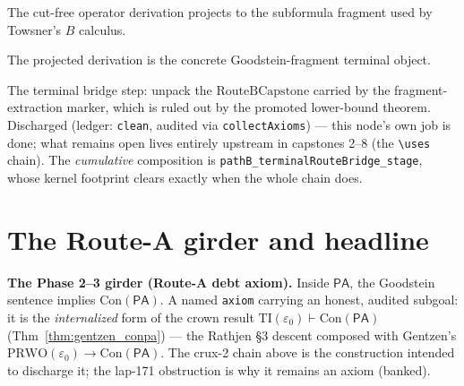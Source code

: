 \begin{theorem}\label{thm:pathBSubformulaProjection}
  \notready
The cut-free operator derivation projects to the subformula fragment used by Towsner's \(B\)
calculus.
\end{theorem}

\begin{theorem}\label{thm:pathBGoodsteinFragmentExtraction}
  \notready
The projected derivation is the concrete Goodstein-fragment terminal object.
\end{theorem}

\begin{theorem}\label{thm:pathBTerminalRouteBridge}
  \leanok
The terminal bridge step: unpack the \(\mathrm{RouteBCapstone}\) carried by the fragment-extraction
marker, which is ruled out by the promoted lower-bound theorem.  Discharged (ledger: \texttt{clean},
audited via \texttt{collectAxioms}) --- this node's own job is done; what remains open lives entirely
upstream in capstones 2--8 (the \texttt{\textbackslash uses} chain).  The \emph{cumulative}
composition is \texttt{pathB\_terminalRouteBridge\_stage}, whose kernel footprint clears exactly when
the whole chain does.
\end{theorem}

\section{The Route-A girder and headline}

\begin{theorem}\label{thm:crux2_axiom}
  \notready
\textbf{The Phase 2--3 girder (Route-A debt axiom).}  Inside \(\mathsf{PA}\), the Goodstein sentence
implies \(\mathrm{Con}(\mathsf{PA})\).  A named \texttt{axiom} carrying an honest, audited subgoal: it
is the \emph{internalized} form of the crown result \(\mathrm{TI}(\varepsilon_0)\vdash
\mathrm{Con}(\mathsf{PA})\) (Thm~\ref{thm:gentzen_conpa}) --- the Rathjen §3 descent composed with Gentzen's
\(\mathrm{PRWO}(\varepsilon_0)\to\mathrm{Con}(\mathsf{PA})\).  The crux-2 chain above is the construction
intended to discharge it; the lap-171 obstruction is why it remains an axiom (banked).
\end{theorem}

